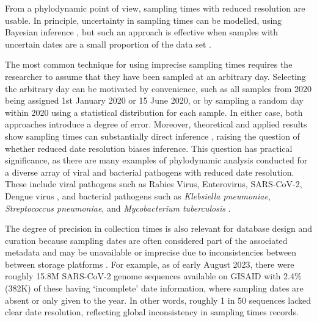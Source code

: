 \documentclass{article}
\begin{document}
\begin{spacing}{1.5}
From a phylodynamic point of view, sampling times with reduced resolution are usable. In principle, uncertainty in sampling times can be modelled, using Bayesian inference \citep{shapiro2011bayesian}, but such an approach is effective when samples with uncertain dates are a small proportion of the data set \citep{rieux2017tipdatingbeast}.

The most common technique for using imprecise sampling times requires the researcher to assume that they have been sampled at an arbitrary day. Selecting the arbitrary day can be motivated by convenience, such as all samples from 2020 being assigned 1st January 2020 or 15 June 2020, or by sampling a random day within 2020 using a statistical distribution for each sample. In either case, both approaches introduce a degree of error. Moreover, theoretical and applied results show sampling times can substantially direct inference \citep{featherstone_decoding_2023,featherstone_infectious_2021,volz_sampling_2014}, raising the question of whether reduced date resolution biases inference. This question has practical significance, as there are many examples of phylodynamic analysis conducted for a diverse array of viral and bacterial pathogens with reduced date resolution. These include viral pathogens such as Rabies Virus, Enterovirus, SARS-CoV-2, Dengue virus \citep{talbi_phylodynamics_2010,xiao_genomic_2022,wolf_temporal_2022,bennett_epidemic_2010}, and bacterial pathogens such as \textit{Klebsiella pneumoniae}, \textit{Streptococcus pneumoniae}, and \textit{Mycobacterium tuberculosis} \citep{cella_multi-drug_2017,azarian_impact_2018,merker_evolutionary_2015}. 

The degree of precision in collection times is also relevant for database design and curation because sampling dates are often considered part of the associated metadata and may be unavailable or imprecise due to inconsistencies between between storage platforms \citep{raza2016big}. For example, as of early August 2023, there were roughly 15.8M SARS-CoV-2 genome sequences available on GISAID with 2.4\% (382K) of these having `incomplete' date information, where sampling dates are absent or only given to the year. In other words, roughly 1 in 50 sequences lacked clear date resolution, reflecting global inconsistency in sampling times records.


\end{spacing}
\end{document}
